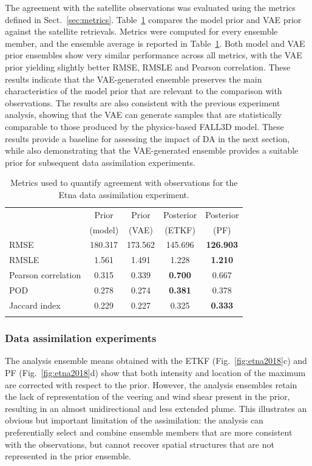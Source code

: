 The agreement with the satellite observations was evaluated using the metrics defined in Sect.~\ref{sec:metrics}. Table~\ref{tab:rmse_metrics} compares the model prior and VAE prior against the satellite retrievals. Metrics were computed for every ensemble member, and the ensemble average is reported in Table~\ref{tab:rmse_metrics}. Both model and VAE prior ensembles show very similar performance across all metrics, with the VAE prior yielding slightly better RMSE, RMSLE and Pearson correlation. These results indicate that the VAE-generated ensemble preserves the main characteristics of the model prior that are relevant to the comparison with observations. The results are also consistent with the previous experiment analysis, showing that the VAE can generate samples that are statistically comparable to those produced by the physics-based FALL3D model.
%
%
These results provide a baseline for assessing the impact of DA in the next section, while also demonstrating that the VAE-generated ensemble provides a suitable prior for subsequent data assimilation experiments.

\begin{table}[htbp]
    \centering
    \caption{Metrics used to quantify agreement with observations for the Etna data assimilation experiment.}
    \label{tab:rmse_metrics}
    \begin{tabular}{lcccc}
        \tophline
         & Prior   & Prior & Posterior & Posterior \\
         & (model) & (VAE) & (ETKF)    & (PF) \\ \middlehline
        RMSE & 180.317 & 173.562 & 145.696 & \textbf{126.903} \\
        RMSLE & 1.561 & 1.491 & 1.228 & \textbf{1.210} \\
        Pearson correlation & 0.315 & 0.339 & \textbf{0.700} & 0.667 \\
        POD & 0.278 & 0.274 & \textbf{0.381} & 0.378 \\
        Jaccard index & 0.229 & 0.227 & 0.325 & \textbf{0.333} \\
        \bottomhline
    \end{tabular}
\end{table}

\subsubsection{Data assimilation experiments}
%
%
The analysis ensemble means obtained with the ETKF (Fig.~\ref{fig:etna2018}c) and PF (Fig.~\ref{fig:etna2018}d) show that both intensity and location of the maximum are corrected with respect to the prior. However, the analysis ensembles retain the lack of representation of the veering and wind shear present in the prior, resulting in an almost unidirectional and less extended plume. This illustrates an obvious but important limitation of the assimilation: the analysis can preferentially select and combine ensemble members that are more consistent with the observations, but cannot recover spatial structures that are not represented in the prior ensemble.

